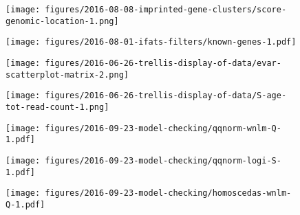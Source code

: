 \documentclass[letterpaper]{article}
\begin{document}
\setcounter{figure}{0}
\makeatletter 
\renewcommand{\thefigure}{S\@arabic\c@figure}
\makeatother

\begin{figure}
\begin{center}
\texttt{[image: figures/2016-08-08-imprinted-gene-clusters/score-genomic-location-1.png]}
\end{center}
\caption{}
\label{fig:clusters}
\end{figure}

\begin{figure}
\begin{center}
\texttt{[image: figures/2016-08-01-ifats-filters/known-genes-1.pdf]}
\caption{}
\label{fig:known-genes}
\end{center}
\end{figure}

\begin{figure}
\begin{center}
\texttt{[image: figures/2016-06-26-trellis-display-of-data/evar-scatterplot-matrix-2.png]}
\end{center}
\caption{}
\label{fig:predictor-associations}
\end{figure}

\begin{figure}
\begin{center}
\texttt{[image: figures/2016-06-26-trellis-display-of-data/S-age-tot-read-count-1.png]}
\end{center}
\caption{}
\label{fig:weight-of-evidence}
\end{figure}

\begin{figure}
\begin{center}
\texttt{[image: figures/2016-09-23-model-checking/qqnorm-wnlm-Q-1.pdf]}
\end{center}
\caption{}
\label{fig:qqnorm-wnlm.Q}
\end{figure}

\begin{figure}
\begin{center}
\texttt{[image: figures/2016-09-23-model-checking/qqnorm-logi-S-1.pdf]}
\end{center}
\caption{}
\label{fig:qqnorm-logi.S}
\end{figure}

\begin{figure}
\begin{center}
\texttt{[image: figures/2016-09-23-model-checking/homoscedas-wnlm-Q-1.pdf]}
\end{center}
\caption{}
\label{fig:homoscedas-wnlm.Q}
\end{figure}
\end{document}
